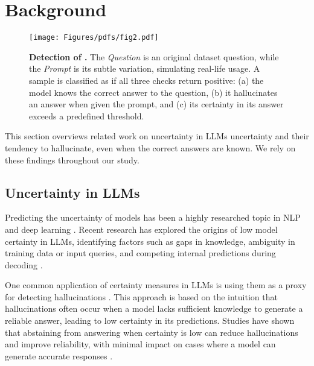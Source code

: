 \section{Background}
\begin{figure*}
\centering
  \centering
\texttt{[image: Figures/pdfs/fig2.pdf]}

\caption{\textbf{Detection of \chk.} The \textit{Question} is an original dataset question, while the \textit{Prompt} is its subtle variation, simulating real-life usage. A sample is classified as \chk if all three checks return positive: (a) the model knows the correct answer to the question, (b) it hallucinates an answer when given the prompt, and (c) its certainty in its answer exceeds a predefined threshold.}

\label{fig:choke_detection_setup}
\end{figure*}


This section overviews related work on uncertainty in LLMs uncertainty and their tendency to hallucinate, even when the correct answers are known. We rely on these findings throughout our study.





\subsection{Uncertainty in LLMs}

Predicting the uncertainty of models has been a highly researched topic in NLP and deep learning \cite{guo2017calibration,xiao2019quantifying,gawlikowski2023survey}.
Recent research has explored the origins of low model certainty in LLMs, identifying factors such as gaps in knowledge, ambiguity in training data or input queries, and competing internal predictions during decoding \cite{hu2023uncertainty,beigi2024rethinking,baan2023uncertainty,yang2024maqa}.

One common application of certainty measures in LLMs is using them as a proxy for detecting hallucinations \cite{kossen2024semantic,wen2024know}.
This approach is based on the intuition that hallucinations often occur when a model lacks sufficient knowledge to generate a reliable answer, leading to low certainty in its predictions.
Studies have shown that abstaining from answering when certainty is low can reduce hallucinations and improve reliability, with minimal impact on cases where a model can generate accurate responses \cite{feng-etal-2024-dont,cole-etal-2023-selectively}.


